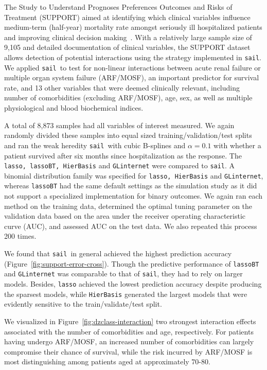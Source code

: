 \documentclass[12pt,letter]{article}\usepackage[]{graphicx}\usepackage[]{color}
\newcommand{\sail}{\texttt{sail}}
\begin{document}
The Study to Understand Prognoses Preferences Outcomes and Risks of Treatment (SUPPORT) aimed at identifying which clinical variables influence medium-term (half-year) mortality rate amongst seriously ill hospitalized patients and improving clinical decision making~\citep{connors1995controlled}. With a relatively large sample size of 9,105 and detailed documentation of clinical variables, the SUPPORT dataset allows detection of potential interactions using the strategy implemented in \sail. We applied \sail ~to test for non-linear interactions between acute renal failure or multiple organ system failure (ARF/MOSF), an important predictor for survival rate, and 13 other variables that were deemed clinically relevant, including number of comorbidities (excluding ARF/MOSF), age, sex, as well as multiple physiological and blood biochemical indices.

A total of 8,873 samples had all variables of interest measured. We again randomly divided these samples into equal sized training/validation/test splits and ran the weak heredity \sail ~with cubic B-splines and $\alpha=0.1$ with whether a patient survived after six months since hospitalization as the response. The \texttt{lasso, lassoBT, HierBasis} and \texttt{GLinternet} were compared to \sail. A binomial distribution family was specified for \texttt{lasso, HierBasis} and \texttt{GLinternet}, whereas \texttt{lassoBT} had the same default settings as the simulation study as it did not support a specialized implementation for binary outcomes. We again ran each method on the training data, determined the optimal tuning parameter on the validation data based on the area under the receiver operating characteristic curve (AUC), and assessed AUC on the test data. We also repeated this process 200 times.

We found that \sail ~in general achieved the highest prediction accuracy (Figure~\ref{fig:support-error-cross}). Though the predictive performance of \texttt{lassoBT} and \texttt{GLinternet} was comparable to that of \sail, they had to rely on larger models. Besides, \texttt{lasso} achieved the lowest prediction accuracy despite producing the sparsest models, while \texttt{HierBasis} generated the largest models that were evidently sensitive to the train/validate/test split.

We visualized in Figure~\ref{fig:dzclass-interaction} two strongest interaction effects associated with the number of comorbidities and age, respectively. For patients having undergo ARF/MOSF, an increased number of comorbidities can largely compromise their chance of survival, while the risk incurred by ARF/MOSF is most distinguishing among patients aged at approximately 70-80.
\end{document}
